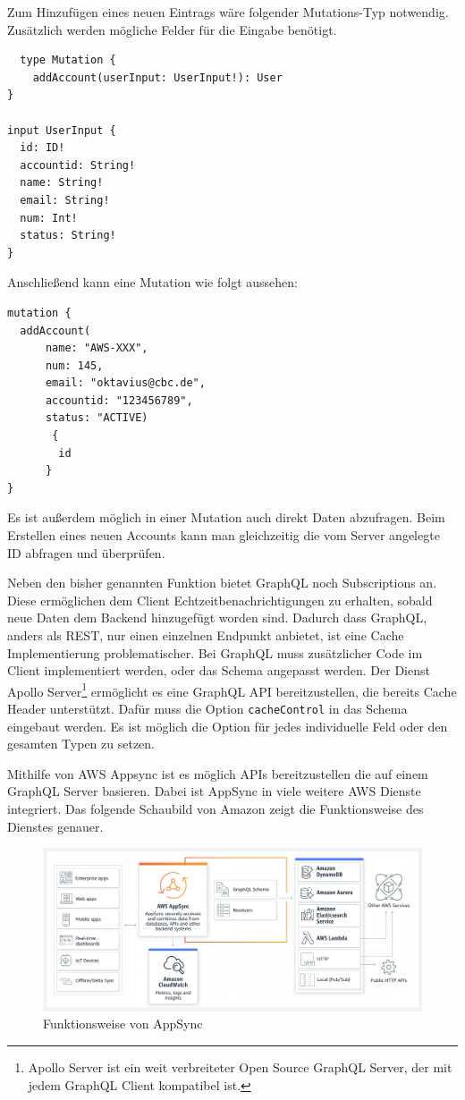 Zum Hinzufügen eines neuen Eintrags wäre folgender Mutations-Typ notwendig.
Zusätzlich werden mögliche Felder für die Eingabe benötigt.


\begin{verbatim}
  type Mutation {
    addAccount(userInput: UserInput!): User
}

input UserInput {
  id: ID!
  accountid: String!
  name: String!
  email: String!
  num: Int!
  status: String!
}
\end{verbatim}

Anschließend kann eine Mutation wie folgt aussehen:

\begin{verbatim}
mutation {
  addAccount(
      name: "AWS-XXX",
      num: 145,
      email: "oktavius@cbc.de",
      accountid: "123456789",
      status: "ACTIVE)
       {
        id
      }
}
\end{verbatim}

Es ist außerdem möglich in einer Mutation auch direkt Daten abzufragen. Beim Erstellen eines neuen Accounts kann man gleichzeitig die
vom Server angelegte ID abfragen und überprüfen.\cite[]{GraphQL1}

Neben den bisher genannten Funktion bietet GraphQL noch Subscriptions an.
Diese ermöglichen dem Client Echtzeitbenachrichtigungen zu erhalten, sobald neue Daten dem Backend hinzugefügt worden sind.
Dadurch dass GraphQL, anders als REST, nur einen einzelnen Endpunkt anbietet, ist eine Cache Implementierung problematischer.
Bei GraphQL muss zusätzlicher Code im Client implementiert werden, oder das Schema angepasst werden.
Der Dienst Apollo Server\footnote{Apollo Server ist ein weit verbreiteter Open Source GraphQL Server, der mit jedem GraphQL Client kompatibel ist.} ermöglicht es
eine GraphQL API bereitzustellen, die bereits Cache Header unterstützt.
Dafür muss die Option \verb+cacheControl+ in das Schema eingebaut werden.
Es ist möglich die Option für jedes individuelle Feld oder den gesamten Typen zu setzen. \cite[]{Apollo}
\cite[]{GraphQL} \cite[]{GraphQL1}

\clearpage
Mithilfe von AWS Appsync ist es möglich APIs bereitzustellen die auf einem GraphQL Server basieren.
Dabei ist AppSync in viele weitere AWS Dienste integriert.
Das folgende Schaubild von Amazon zeigt die Funktionsweise des Dienstes genauer.
\begin{figure}[htbp]
    \centering
    \includegraphics[width=1.0\textwidth]{40-AWS/Appsync.png}
    \caption{Funktionsweise von AppSync \cite[]{AppSync}  }
    \label{fig:meine-grafik}
\end{figure}

